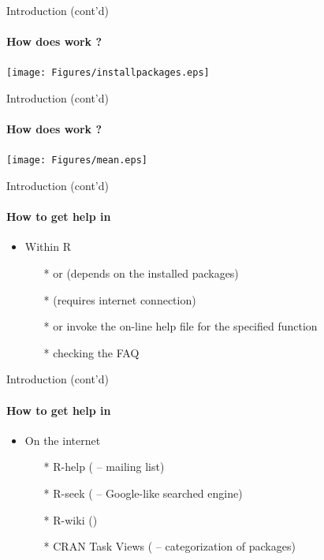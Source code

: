 \documentclass[14pt, aspectratio=169, sectionpage=simple, xclolor=table]{beamer}
\begin{document}
\begin{frame}{ Introduction (cont'd)}
\framesubtitle{How does \R work ?}
\vspace*{-3mm}
\texttt{[image: Figures/installpackages.eps]}
\end{frame}
\begin{frame}{ Introduction (cont'd)}
\framesubtitle{How does \R work ?}
\vspace*{-3mm}
\texttt{[image: Figures/mean.eps]}
\end{frame}
\begin{frame}{Introduction (cont'd)}
\framesubtitle{How to get help in \R }
	\begin{itemize}
		\item Within R
		\begin{itemize}
			\item[*]  or  (depends on the
			installed packages)
			\item[*]  (requires internet connection)
			\item[*]  or  invoke the on-line help file for the
			specified function
			\item[*] checking the FAQ
		\end{itemize}
	\end{itemize}
\end{frame}	
\begin{frame}{Introduction (cont'd)}
\framesubtitle{How to get help in \R }
	\begin{itemize}
		\item On the internet
		\begin{itemize}
			\item[*] \textsf{R}-help (
			-- mailing list)
			\item[*] \textsf{R}-seek ( -- Google-like
			searched engine)
			\item[*] \textsf{R}-wiki ()
			\item[*] CRAN Task Views (
			-- categorization of packages)	
		\end{itemize}
	\end{itemize}
\end{frame}
\end{document}
